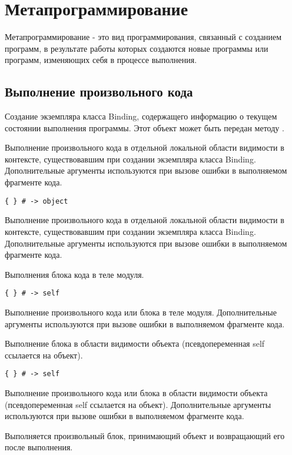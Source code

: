 \section{Метапрограммирование}

Метапрограммирование - это вид программирования, связанный с созданием программ, в результате работы которых создаются новые программы или программ, изменяющих себя в процессе выполнения.

\subsection{Выполнение произвольного кода}

\begin{methodlist}
  Создание экземпляра класса Binding, содержащего информацию о текущем состоянии выполнения программы. Этот объект может быть передан методу .
 
  Выполнение произвольного кода в отдельной локальной области видимости в контексте, существовавшим при создании экземпляра класса Binding. Дополнительные аргументы используются при вызове ошибки в выполняемом фрагменте кода.
 
  \verb!{ } # -> object!

  Выполнение произвольного кода в отдельной локальной области видимости в контексте, существовавшим при создании экземпляра класса Binding. Дополнительные аргументы используются при вызове ошибки в выполняемом фрагменте кода.
 
  Выполнения блока кода в теле модуля. 
 
  \verb!{ } # -> self!

  Выполнение произвольного кода или блока в теле модуля. Дополнительные аргументы используются при вызове ошибки в выполняемом фрагменте кода.
  
  Выполнение блока в области видимости объекта (псевдопеременная self ссылается на объект).

  \verb!{ } # -> self!

  Выполнение произвольного кода или блока в области видимости объекта (псевдопеременная self ссылается на объект). Дополнительные аргументы используются при вызове ошибки в выполняемом фрагменте кода.

  Выполняется произвольный блок, принимающий объект и возвращающий его после выполнения.
\end{methodlist}

